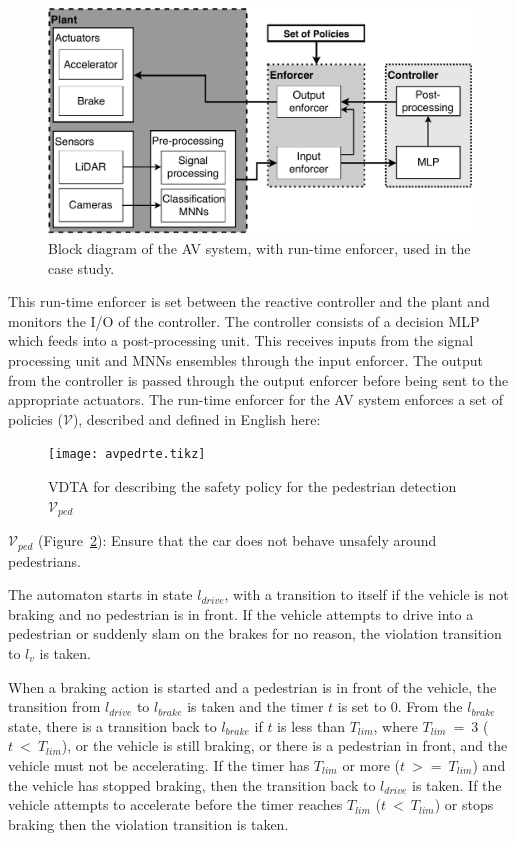 \begin{figure}[h]
	\centering
	\includegraphics[scale=0.6]{Content/fig/AV-sys.pdf}
	\caption{Block diagram of the \ac{AV} system, with run-time enforcer, used in the case study. \label{fig:avenf}}
\end{figure}

This run-time enforcer is set between the reactive controller and the plant and monitors the I/O of the controller.
The controller consists of a decision \ac{MLP} which feeds into a post-processing unit.
This receives inputs from the signal processing unit and \acp{MNN} ensembles through the input enforcer.
The output from the controller is passed through the output enforcer before being sent to the appropriate actuators.
The run-time enforcer for the \ac{AV} system enforces a set of policies ($\mathcal{V}$), described and defined in English here:

\begin{figure}[h]
	\centering
	\texttt{[image: avpedrte.tikz]}
	\caption{\ac{VDTA} for describing the safety policy for the pedestrian detection $\mathcal{V}_{ped}$\label{fig:avpedrte}}
\end{figure}

$\mathcal{V}_{ped}$ (Figure~\ref{fig:avpedrte}): Ensure that the car does not behave unsafely around pedestrians. 

The automaton starts in state $l_{drive}$, with a transition to itself if the vehicle is not braking and no pedestrian is in front.
If the vehicle attempts to drive into a pedestrian or suddenly slam on the brakes for no reason, the violation transition to $l_v$ is taken.
 
When a braking action is started and a pedestrian is in front of the vehicle, the transition from $l_{drive}$ to $l_{brake}$ is taken and the timer $t$ is set to 0.
From the $l_{brake}$ state, there is a transition back to $l_{brake}$ if $t$ is less than $T_{lim}$, where $T_{lim}~=~3$ ($t~<~T_{lim}$), or the vehicle is still braking, or there is a pedestrian in front, and the vehicle must not be accelerating.
If the timer has $T_{lim}$ or more ($t~>=~T_{lim}$) and the vehicle has stopped braking, then the transition back to $l_{drive}$ is taken.
If the vehicle attempts to accelerate before the timer reaches $T_{lim}$ ($t~<~T_{lim}$) or stops braking then the violation transition is taken.

